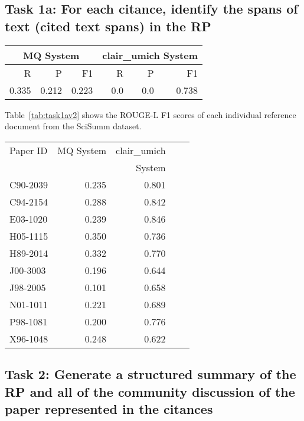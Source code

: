 \documentclass[11pt]{article}
\begin{document}
\subsection{Task 1a: For each citance, identify the spans of text 
			(cited text spans) in the RP}

\begin{table*}
\centering
	\begin{tabular}{|r|r|r|r|r|r|}
	\hline
	\multicolumn{3}{|c|}{MQ System} & \multicolumn{3}{|c|}{clair\_umich System}\\
	\hline
	R & P & F1 & R & P & F1\\
	\hline
	0.335 & 0.212 & 0.223 & 0.0 & 0.0 & 0.738\\
	\hline
	\end{tabular}
\caption{Task 1a performance for the participating systems expressed as ROUGE-L score
 averaged over all topics}
\label{tab:task1a}
\end{table*}

Table~\ref{tab:task1av2} shows the ROUGE-L F1 scores of each individual 
reference document from the SciSumm dataset.

\begin{table*}
  \centering
  \begin{tabular}{|l|r|r|r|r|}
  	\hline
	Paper ID & MQ System & clair\_umich \\
	&	&	System\\
	\hline
	C90-2039 & 0.235 & 0.801\\ 
	C94-2154 & 0.288 & 0.842\\
	E03-1020 & 0.239 & 0.846\\
	H05-1115 & 0.350 & 0.736\\
	H89-2014 & 0.332 & 0.770\\
	J00-3003 & 0.196 & 0.644\\
	J98-2005 & 0.101 & 0.658\\
	N01-1011 & 0.221 & 0.689\\
	P98-1081 & 0.200 & 0.776\\
	X96-1048 & 0.248 & 0.622\\
	\hline
  \end{tabular}
\caption{Task 1a ROUGE-L F1 scores for individual topics}
\label{tab:task1av2}
\end{table*}

\subsection{Task 2: Generate a structured summary of the RP and all of the 
			community discussion of the paper represented in the citances}
\end{document}
